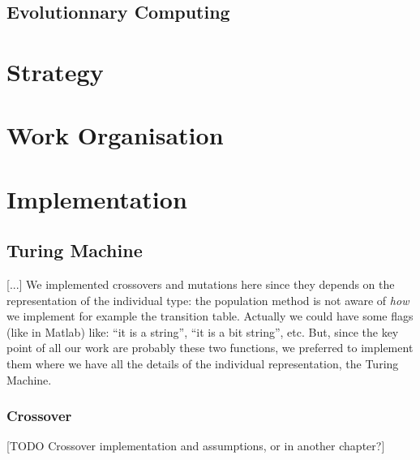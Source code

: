 \documentclass{report}
\begin{document}

\section{Evolutionnary Computing}
\label{sec:ec}

\chapter{Strategy}
\label{chap:strategy}

\chapter{Work Organisation}
\label{chap:wo}

\chapter{Implementation}
\label{chap:impl}

\section{Turing Machine}
[...]
We implemented crossovers and mutations here since they depends on the representation of the individual type: the population method is not aware of \textit{how} we implement for example the transition table. Actually we could have some flags (like in Matlab) like: ``it is a string'', ``it is a bit string'', etc. But, since the key point of all our work are probably these two functions, we preferred to implement them where we have all the details of the individual representation, the Turing Machine.

\subsection{Crossover}
\label{sec:crossover}
[TODO Crossover implementation and assumptions, or in another chapter?]
\end{document}
